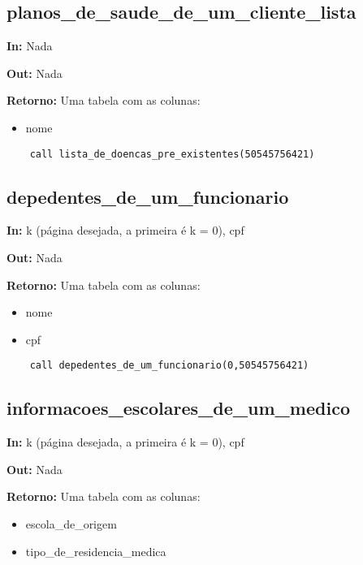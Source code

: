 \subsection{planos\_de\_saude\_de\_um\_cliente\_lista}

\textbf{In:} Nada

\textbf{Out:} Nada

\textbf{Retorno:} Uma tabela com as colunas:

\begin{itemize}
	\item nome
\end{itemize}

\begin{verbatim}
	call lista_de_doencas_pre_existentes(50545756421)
\end{verbatim}


\subsection{depedentes\_de\_um\_funcionario}

\textbf{In:} k (página desejada, a primeira é k = 0), cpf

\textbf{Out:} Nada

\textbf{Retorno:} Uma tabela com as colunas:

\begin{itemize}
	\item nome
	\item cpf
\end{itemize}

\begin{verbatim}
	call depedentes_de_um_funcionario(0,50545756421)
\end{verbatim}

\subsection{informacoes\_escolares\_de\_um\_medico}

\textbf{In:} k (página desejada, a primeira é k = 0), cpf

\textbf{Out:} Nada

\textbf{Retorno:} Uma tabela com as colunas:

\begin{itemize}
	\item escola\_de\_origem
	\item tipo\_de\_residencia\_medica
\end{itemize}

